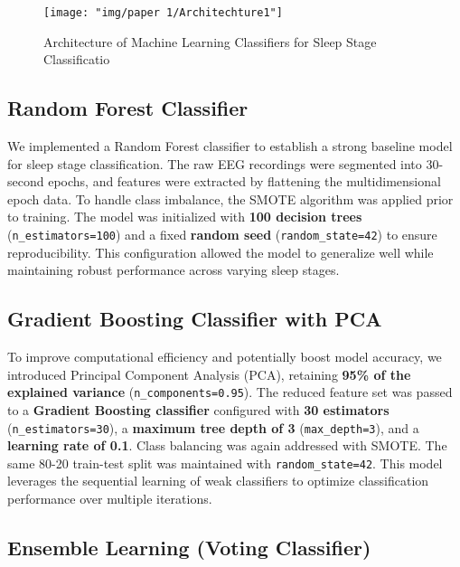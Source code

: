 \begin{figure}
	\centering
	\texttt{[image: "img/paper 1/Architechture1"]}
	\caption{Architecture of Machine Learning Classifiers for Sleep Stage
		Classificatio}
	\label{fig:architechture1}
\end{figure}







\subsection{Random Forest Classifier}

We implemented a Random Forest classifier to establish a strong baseline model for sleep stage classification. The raw EEG recordings were segmented into 30-second epochs, and features were extracted by flattening the multidimensional epoch data. To handle class imbalance, the SMOTE algorithm was applied prior to training. The model was initialized with \textbf{100 decision trees} (\texttt{n\_estimators=100}) and a fixed \textbf{random seed} (\texttt{random\_state=42}) to ensure reproducibility. This configuration allowed the model to generalize well while maintaining robust performance across varying sleep stages.

\subsection{Gradient Boosting Classifier with PCA}

To improve computational efficiency and potentially boost model accuracy, we introduced Principal Component Analysis (PCA), retaining \textbf{95\% of the explained variance} (\texttt{n\_components=0.95}). The reduced feature set was passed to a \textbf{Gradient Boosting classifier} configured with \textbf{30 estimators} (\texttt{n\_estimators=30}), a \textbf{maximum tree depth of 3} (\texttt{max\_depth=3}), and a \textbf{learning rate of 0.1}. Class balancing was again addressed with SMOTE. The same 80-20 train-test split was maintained with \texttt{random\_state=42}. This model leverages the sequential learning of weak classifiers to optimize classification performance over multiple iterations.

\subsection{Ensemble Learning (Voting Classifier)}

